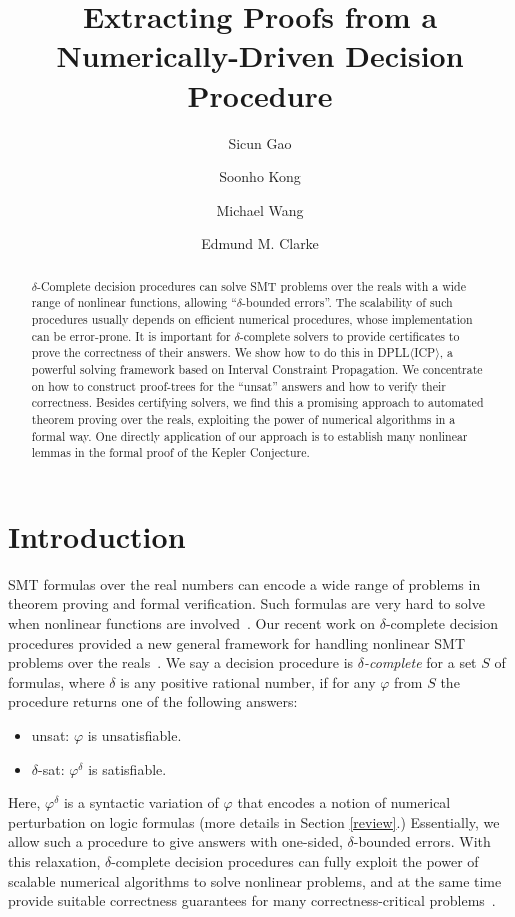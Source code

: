 \documentclass[envcountsect]{llncs}
\title{Extracting Proofs from a Numerically-Driven Decision Procedure}
\author{Sicun Gao \and Soonho Kong \and Michael Wang \and Edmund M. Clarke}
\institute{Carnegie Mellon University, Pittsburgh, PA 15213}
\begin{document}
\maketitle

\begin{abstract}
$\delta$-Complete decision procedures can solve SMT problems over the
reals with a wide range of nonlinear functions, allowing ``$\delta$-bounded
errors''. The scalability of such procedures usually depends on efficient
numerical procedures, whose implementation can be error-prone. It is important
for $\delta$-complete solvers to provide certificates to prove the correctness
of their answers. We show how to do this in DPLL$\langle$ICP$\rangle$, a
powerful solving framework based on Interval Constraint Propagation. We
concentrate on how to construct proof-trees for the ``unsat'' answers and how to
verify their correctness. Besides certifying solvers, we find this a promising 
approach to automated theorem proving over the reals, exploiting the power of
numerical algorithms in a formal way. One directly application of our approach
is to establish many nonlinear lemmas in the formal proof of the Kepler
Conjecture. 
\end{abstract}

\section{Introduction}

SMT formulas over the real numbers can encode a wide range of problems in
theorem proving and formal verification. Such formulas are very hard to solve
when nonlinear functions are involved~\cite{}. Our recent work on
{$\delta$-complete decision procedures} provided a new general framework for
handling nonlinear SMT problems over the reals~\cite{}. We say a decision
procedure is {\em $\delta$-complete} for a set $S$ of formulas, where $\delta$
is any positive rational number, if for any $\varphi$ from $S$ the procedure
returns one of the following answers:
\begin{itemize}
 \item {\sf unsat}: $\varphi$ is unsatisfiable.
 \item {\sf $\delta$-sat}: $\varphi^{\delta}$ is satisfiable.
\end{itemize}
Here, $\varphi^{\delta}$ is a syntactic variation of $\varphi$ that encodes a
notion of numerical perturbation on logic formulas (more
details in Section \ref{review}.) Essentially, we allow such a procedure to
give answers with one-sided, $\delta$-bounded errors. With this relaxation,
$\delta$-complete decision procedures can fully exploit the
power of scalable numerical algorithms to solve nonlinear
problems, and at the same time provide suitable correctness
guarantees for many correctness-critical problems~\cite{}. 
\end{document}
